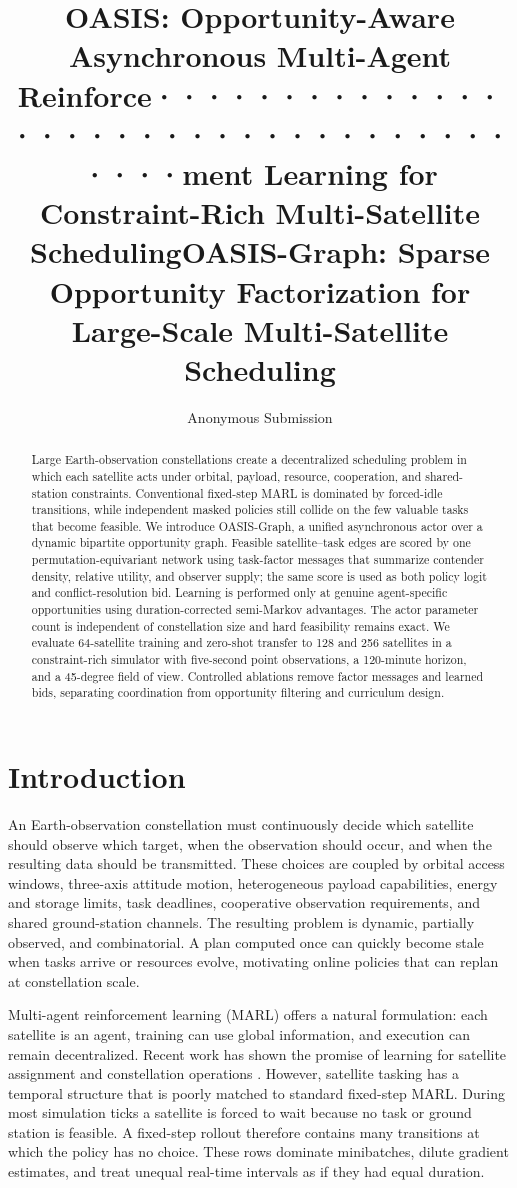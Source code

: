 \documentclass[letterpaper]{article}
\title{OASIS: Opportunity-Aware Asynchronous Multi-Agent Reinforce······································ment Learning for Constraint-Rich Multi-Satellite Scheduling}
\title{OASIS-Graph: Sparse Opportunity Factorization for Large-Scale Multi-Satellite Scheduling}
\author{Anonymous Submission}
\begin{document}
\maketitle

\begin{abstract}
Large Earth-observation constellations create a decentralized scheduling problem in which each satellite acts under orbital, payload, resource, cooperation, and shared-station constraints.  Conventional fixed-step MARL is dominated by forced-idle transitions, while independent masked policies still collide on the few valuable tasks that become feasible.  We introduce OASIS-Graph, a unified asynchronous actor over a dynamic bipartite opportunity graph.  Feasible satellite--task edges are scored by one permutation-equivariant network using task-factor messages that summarize contender density, relative utility, and observer supply; the same score is used as both policy logit and conflict-resolution bid.  Learning is performed only at genuine agent-specific opportunities using duration-corrected semi-Markov advantages.  The actor parameter count is independent of constellation size and hard feasibility remains exact.  We evaluate 64-satellite training and zero-shot transfer to 128 and 256 satellites in a constraint-rich simulator with five-second point observations, a 120-minute horizon, and a 45-degree field of view.  Controlled ablations remove factor messages and learned bids, separating coordination from opportunity filtering and curriculum design.
\end{abstract}

\section{Introduction}

An Earth-observation constellation must continuously decide which satellite should observe which target, when the observation should occur, and when the resulting data should be transmitted.  These choices are coupled by orbital access windows, three-axis attitude motion, heterogeneous payload capabilities, energy and storage limits, task deadlines, cooperative observation requirements, and shared ground-station channels.  The resulting problem is dynamic, partially observed, and combinatorial.  A plan computed once can quickly become stale when tasks arrive or resources evolve, motivating online policies that can replan at constellation scale.

Multi-agent reinforcement learning (MARL) offers a natural formulation: each satellite is an agent, training can use global information, and execution can remain decentralized.  Recent work has shown the promise of learning for satellite assignment and constellation operations \cite{holder2025satellite,herrmann2024single,he2025transformer}.  However, satellite tasking has a temporal structure that is poorly matched to standard fixed-step MARL.  During most simulation ticks a satellite is forced to wait because no task or ground station is feasible.  A fixed-step rollout therefore contains many transitions at which the policy has no choice.  These rows dominate minibatches, dilute gradient estimates, and treat unequal real-time intervals as if they had equal duration.
\end{document}
